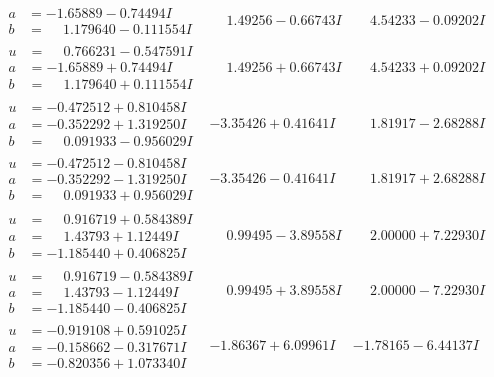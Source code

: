 \documentclass[1p]{elsarticle_modified}
\theoremstyle{definition}
\begin{document}
$$\begin{array}{c|c|c}
\begin{aligned}
a &= -1.65889 - 0.74494 I \\
b &= \phantom{-}1.179640 - 0.111554 I\end{aligned}
 & \phantom{-}1.49256 - 0.66743 I & \phantom{-}4.54233 - 0.09202 I \\ \hline\begin{aligned}
u &= \phantom{-}0.766231 - 0.547591 I \\
a &= -1.65889 + 0.74494 I \\
b &= \phantom{-}1.179640 + 0.111554 I\end{aligned}
 & \phantom{-}1.49256 + 0.66743 I & \phantom{-}4.54233 + 0.09202 I \\ \hline\begin{aligned}
u &= -0.472512 + 0.810458 I \\
a &= -0.352292 + 1.319250 I \\
b &= \phantom{-}0.091933 - 0.956029 I\end{aligned}
 & -3.35426 + 0.41641 I & \phantom{-}1.81917 - 2.68288 I \\ \hline\begin{aligned}
u &= -0.472512 - 0.810458 I \\
a &= -0.352292 - 1.319250 I \\
b &= \phantom{-}0.091933 + 0.956029 I\end{aligned}
 & -3.35426 - 0.41641 I & \phantom{-}1.81917 + 2.68288 I \\ \hline\begin{aligned}
u &= \phantom{-}0.916719 + 0.584389 I \\
a &= \phantom{-}1.43793 + 1.12449 I \\
b &= -1.185440 + 0.406825 I\end{aligned}
 & \phantom{-}0.99495 - 3.89558 I & \phantom{-}2.00000 + 7.22930 I \\ \hline\begin{aligned}
u &= \phantom{-}0.916719 - 0.584389 I \\
a &= \phantom{-}1.43793 - 1.12449 I \\
b &= -1.185440 - 0.406825 I\end{aligned}
 & \phantom{-}0.99495 + 3.89558 I & \phantom{-}2.00000 - 7.22930 I \\ \hline\begin{aligned}
u &= -0.919108 + 0.591025 I \\
a &= -0.158662 - 0.317671 I \\
b &= -0.820356 + 1.073340 I\end{aligned}
 & -1.86367 + 6.09961 I & -1.78165 - 6.44137 I \\ \hline\begin{aligned}

\end{aligned}
\end{array}$$
\end{document}
